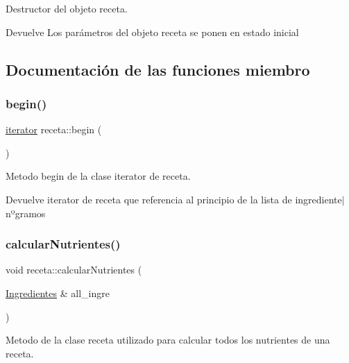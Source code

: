 Destructor del objeto receta. 

\begin{DoxyReturn}{Devuelve}
Los parámetros del objeto receta se ponen en estado inicial 
\end{DoxyReturn}


\subsection{Documentación de las funciones miembro}
\mbox{\label{classreceta_a625bfcff90bc88689c85f65d36e5e8e6}} 
\subsubsection{\texorpdfstring{begin()}{begin()}}
{\footnotesize\ttfamily \hyperlink{classreceta_1_1iterator}{iterator} receta\+::begin (\begin{DoxyParamCaption}{ }\end{DoxyParamCaption})\hspace{0.3cm}{\ttfamily [inline]}}



Metodo begin de la clase iterator de receta. 

\begin{DoxyReturn}{Devuelve}
iterator de receta que referencia al principio de la lista de ingrediente$\vert$nºgramos 
\end{DoxyReturn}
\mbox{\label{classreceta_adce4140e595d20b43aa7c7f643003bdd}} 
\subsubsection{\texorpdfstring{calcular\+Nutrientes()}{calcularNutrientes()}}
{\footnotesize\ttfamily void receta\+::calcular\+Nutrientes (\begin{DoxyParamCaption}\item[{\hyperlink{classIngredientes}{Ingredientes} \&}]{all\+\_\+ingre }\end{DoxyParamCaption})}



Metodo de la clase receta utilizado para calcular todos los nutrientes de una receta. 


